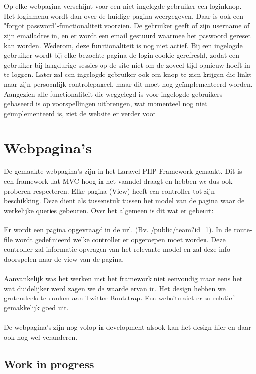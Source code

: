 \documentclass[11pt, a4paper]{article}
\begin{document}
\\
\\
Op elke webpagina verschijnt voor een niet-ingelogde gebruiker een loginknop. Het loginmenu wordt dan over de huidige pagina weergegeven. Daar is ook een "forgot password"-functionaliteit voorzien. De gebruiker geeft of zijn username of zijn emailadres in, en er wordt een email gestuurd waarmee het paswoord gereset kan worden. Wederom, deze functionaliteit is nog niet actief. Bij een ingelogde gebruiker wordt bij elke bezochte pagina de login cookie gerefresht, zodat een gebruiker bij langdurige sessies op de site niet om de zoveel tijd opnieuw hoeft in te loggen. Later zal een ingelogde gebruiker ook een knop te zien krijgen die linkt naar zijn persoonlijk controlepaneel, maar dit moet nog ge\"implementeerd worden. Aangezien alle functionaliteit die weggelegd is voor ingelogde gebruikers gebaseerd is op voorspellingen uitbrengen, wat momenteel nog niet ge\"implementeerd is, ziet de website er verder voor

\section{Webpagina's}
De gemaakte webpagina's zijn in het Laravel PHP Framework gemaakt. Dit is een framework dat MVC hoog in het vaandel draagt en hebben we dus ook proberen respecteren.
Elke pagina (View) heeft een controller tot zijn beschikking. Deze dient als tussenstuk tussen het model van de pagina waar de werkelijke queries gebeuren. Over het algemeen is dit wat er gebeurt:
\\
\\
Er wordt een pagina opgevraagd in de url. (Bv. /public/team?id=1). In de route-file wordt gedefinieerd welke controller er opgeroepen moet worden. Deze controller zal informatie opvragen van het 
relevante model en zal deze info doorspelen naar de view van de pagina. 
\\
\\
Aanvankelijk was het werken met het framework niet eenvoudig maar eens het wat duidelijker werd zagen we de waarde ervan in.
Het design hebben we grotendeels te danken aan Twitter Bootstrap. Een website ziet er zo relatief gemakkelijk goed uit. 
\\
\\
De webpagina's zijn nog volop in development alsook kan het design hier en daar ook nog wel veranderen. 

\subsection{Work in progress}
\end{document}
